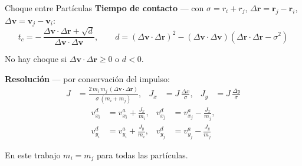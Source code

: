 \documentclass[aspectratio=43,11pt]{beamer}
\begin{document}
\begin{frame}{Choque entre Partículas}
  \small
  \textbf{Tiempo de contacto} --- con $\sigma = r_i + r_j$,
  $\Delta\bm{r} = \bm{r}_j - \bm{r}_i$, $\Delta\bm{v} = \bm{v}_j - \bm{v}_i$:
  \[
    t_c = -\,\frac{\Delta\bm{v}\cdot\Delta\bm{r} + \sqrt{d}}{\Delta\bm{v}\cdot\Delta\bm{v}},
    \qquad
    d = (\Delta\bm{v}\cdot\Delta\bm{r})^2 - (\Delta\bm{v}\cdot\Delta\bm{v})\left(\Delta\bm{r}\cdot\Delta\bm{r} - \sigma^2\right)
  \]
  {\scriptsize No hay choque si $\Delta\bm{v}\cdot\Delta\bm{r} \geq 0$ o $d < 0$.\par}
  \vspace{0.05cm}

  \textbf{Resolución} --- por conservación del impulso:
  \begin{align*}
    J &= \frac{2\,m_i\,m_j\,(\Delta\bm{v}\cdot\Delta\bm{r})}{\sigma\,(m_i + m_j)},
    &J_x &= J\,\frac{\Delta x}{\sigma},
    &J_y &= J\,\frac{\Delta y}{\sigma}
  \end{align*}
  \vspace{-0.4cm}
  \begin{align*}
    v_{x_i}^{d} &= v_{x_i}^{a} + \frac{J_x}{m_i}, &
    v_{x_j}^{d} &= v_{x_j}^{a} - \frac{J_x}{m_j}, \\
    v_{y_i}^{d} &= v_{y_i}^{a} + \frac{J_y}{m_i}, &
    v_{y_j}^{d} &= v_{y_j}^{a} - \frac{J_y}{m_j}
  \end{align*}
  \vspace{-0.15cm}

  {\scriptsize En este trabajo $m_i = m_j$ para todas las partículas.\par}
\end{frame}
\end{document}

